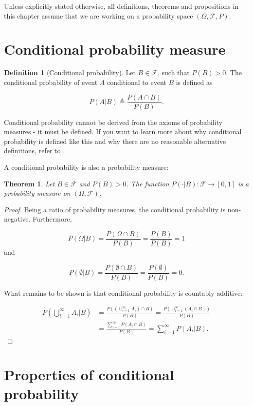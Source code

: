 \documentclass{book}
\theoremstyle{plain}%
\newtheorem{theorem}{Theorem}[section]
\theoremstyle{definition}
\newtheorem{definition}{Definition}[section]
\newlength{\arrow}
\begin{document}
Unless explicitly stated otherwise, all definitions, theorems and propositions in this chapter assume that we are working on a probability space $(\Omega, \mathcal{F}, P)$.

\section{Conditional probability measure}

\begin{definition}[Conditional probability] Let $B \in \mathcal{F}$, such that $P(B) > 0$. The conditional probability of event $A$ conditional to event $B$ is defined as

$$P(A|B) \triangleq \frac{P(A \cap B)}{P(B)}.$$
\end{definition}


Conditional probability cannot be derived from the axioms of probability measures - it must be defined. If you want to learn more about why conditional probability is defined like this and why there are no reasonable alternative definitions, refer to \citet[Ch.~2]{Kadane2011}.

A conditional probability is also a probability measure:

\begin{theorem}
Let $B \in \mathcal{F}$ and $P(B) > 0$. The function $P(\cdot|B):\mathcal{F} \rightarrow [0,1]$ is a probability measure on $(\Omega, \mathcal{F})$.
\end{theorem}

\begin{proof}
Being a ratio of probability measures, the conditional probability is non-negative. Furthermore,

$$P(\Omega|B) = \frac{P(\Omega \cap B)}{P(B)} =  \frac{P(B)}{P(B)} = 1$$ and

$$P(\emptyset|B) = \frac{P(\emptyset \cap B)}{P(B)} =  \frac{P(\emptyset)}{P(B)} = 0.$$

What remains to be shown is that conditional probability is countably additive:

\begin{align*}
P(\bigcup_{i=1}^\infty A_i | B) &= \frac{P((\cup_{i=1}^\infty A_i)\cap B)}{P(B)} = \frac{P(\cup_{i=1}^\infty (A_i\cap B))}{P(B)} \\ &= \frac{\sum_{i=1}^\infty P(A_i \cap B)}{P(B)} = \sum_{i=1}^\infty P(A_i | B).
\end{align*}
\end{proof}

\section{Properties of conditional probability}
\end{document}
